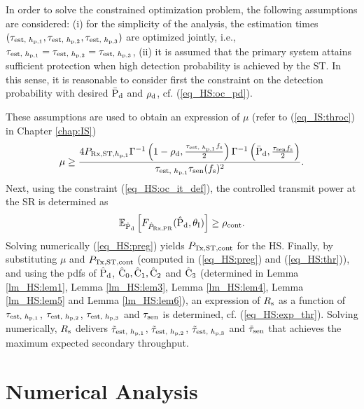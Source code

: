 \begin{IEEEproof}[Solution] 
In order to solve the constrained optimization problem, the following assumptions are considered: (i) for the simplicity of the analysis, the estimation times $(\tau_{\text{est, $h_{\text{p,1}}$}}, \tau_{\text{est, $h_{\text{p,2}}$}}, \tau_{\text{est, $h_{\text{p,3}}$}})$ are optimized jointly, i.e., $\tau_{\text{est, $h_{\text{p,1}}$}} = \tau_{\text{est, $h_{\text{p,2}}$}} = \tau_{\text{est, $h_{\text{p,3}}$}}$, (ii) it is assumed that the primary system attains sufficient protection when high detection probability is achieved by the ST. In this sense, it is reasonable to consider first the constraint on the detection probability with desired $\bar{\text{P}}_{\text{d}}$ and $\rho_{\text{d}}$, cf. (\ref{eq_HS:oc_pd}). 

These assumptions are used to obtain an expression of $\mu$ (refer to (\ref{eq_IS:throc}) in Chapter \ref{chap:IS}) 
\begin{align}
\mu \ge \frac{4 P_{\text{Rx,ST,$h_{\text{p,1}}$}} \Gamma^{-1} \left(1 - \rho_{\text{d}}, \frac{\tau_{\text{est, $h_{\text{p,1}}$}} f_{\text{s}}}{2}\right) \Gamma^{-1} \left(\bar{\text{P}}_{\text{d}}, \frac{\tau_{\text{sen}} f_{\text{s}}}{2}\right)}{ \tau_{\text{est, $h_{\text{p,1}}$}} \tau_{\text{sen}} (f_{\text{s}})^2  }. 
\label{eq_HS:thr}
\end{align}
Next, using the constraint (\ref{eq_HS:oc_it_def}), the controlled transmit power at the SR is determined as  
\begin{align}
\e{\epd}{\fprcvdpr(\epd, \ite)} \ge \opc.%
\label{eq_HS:preg}
\end{align}
Solving numerically (\ref{eq_HS:preg}) yields $P_{\text{Tx,ST,cont}}$ for the HS.
Finally, by substituting $\mu$ and $P_{\text{Tx,ST,cont}}$ (computed in (\ref{eq_HS:preg}) and (\ref{eq_HS:thr})), and using the pdfs of $\hat{\text{P}}_{\text{d}}$, $\hat{\text{C}}_{\text{0}}, \hat{\text{C}}_{\text{1}}, \hat{\text{C}}_{\text{2}}$ and $\hat{\text{C}}_{\text{3}}$ (determined in Lemma \ref{lm_HS:lem1}, Lemma \ref{lm_HS:lem3}, Lemma \ref{lm_HS:lem4}, Lemma \ref{lm_HS:lem5} and Lemma \ref{lm_HS:lem6}), an expression of $R_{\text{s}}$ as a function of $\tau_{\text{est, $h_{\text{p,1}}$}}$, $\tau_{\text{est, $h_{\text{p,2}}$}}$, $\tau_{\text{est, $h_{\text{p,3}}$}}$ and $\tau_{\text{sen}}$ is determined, cf. (\ref{eq_HS:exp_thr}). Solving numerically, $R_{\text{s}}$ delivers $\tilde{\tau}_{\text{est, $h_{\text{p,1}}$}}$, $\tilde{\tau}_{\text{est, $h_{\text{p,2}}$}}$, $\tilde{\tau}_{\text{est, $h_{\text{p,3}}$}}$ and $\tilde{\tau}_{\text{sen}}$ that achieves the maximum expected secondary throughput.  
\end{IEEEproof}
\section{Numerical Analysis} \label{sec_HS:num_ana}

